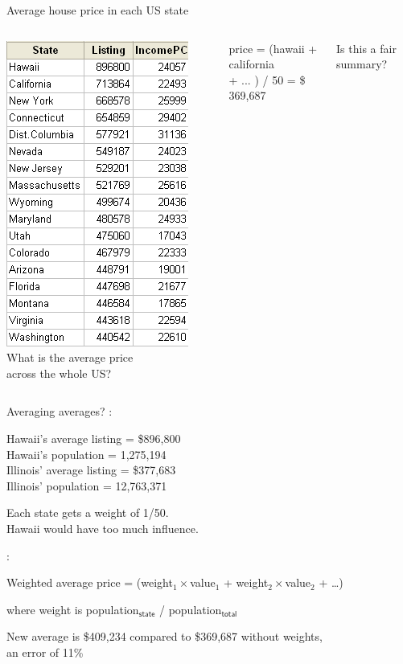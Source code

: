 \documentclass[aspectratio=169,usenames,dvipsnames]{beamer}
\begin{document}
\begin{frame}{Average house price in each US state}
\begin{columns}
\includegraphics[height=0.8\textheight]{fig/housepricesincome}
What is the average price \\
across the whole US?

\pause\vspace{1em}
price = (hawaii + california \\
    + ... ) / 50 = \$ 369,687

\vspace{1em}
Is this a fair summary?
\end{columns}
\end{frame}

\begin{frame}{Averaging averages?}
:

Hawaii's average listing = \$896,800\\
Hawaii's population = 1,275,194\\
Illinois' average listing = \$377,683\\
Illinois' population = 12,763,371

\vspace{1em}
Each state gets a weight of 1/50.\\
Hawaii would have too much influence.

\pause
{}:
\begin{block}{Weighted average}
price = (weight$_1 \times $value$_1$ + weight$_2 \times $value$_2$ + \dots)

    where weight is population$_{\textsf{state}}$ / population$_{\textsf{total}}$
\end{block}

\vspace{1em}
New average is \$409,234 compared to \$369,687 without weights, \\
an error of 11\%
\end{frame}
\end{document}
